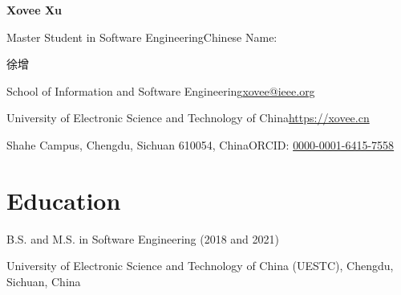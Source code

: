 \documentclass{article}
\begin{document}
\begin{center}
    \Huge{
    \textbf{Xovee Xu}}
\end{center}



\noindent Master Student in Software Engineering\hfill Chinese Name: \begin{CJK*}{UTF8}{gkai}徐增\end{CJK*}

\noindent School of Information and Software Engineering\hfill \href{mailto:xovee@ieee.org}{xovee@ieee.org}

\noindent University of Electronic Science and Technology of China\hfill \url{https://xovee.cn}


\noindent Shahe Campus, Chengdu, Sichuan 610054, China\hfill ORCID: \href{https://orcid.org/0000-0001-6415-7558}{0000-0001-6415-7558}


\setlength{\parskip}{3pt}


\vspace{-8pt}
\section*{Education}
\vspace{-4pt}
\indent 


B.S. and M.S. in Software Engineering (2018 and 2021)

University of Electronic Science and Technology of China (UESTC), Chengdu, Sichuan, China






\end{document}
